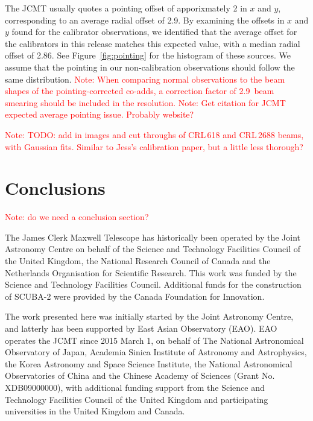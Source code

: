 \documentclass[twocolumn,times]{aastex6}
\newcommand{\note}[1]{\textcolor{red}{Note: #1}}
\begin{document}
The JCMT usually quotes a pointing offset of apporixmately 2\arcsec{}
in $x$ and $y$, corresponding to an average radial offset of
2.9\arcsec{}. By examining the offsets in $x$ and $y$ found for the
calibrator observations, we identified that the average offset for the
calibrators in this release matches this expected value, with a median
radial offset of 2.86\arcsec{}. See Figure~\ref{fig:pointing} for the
histogram of these sources. We assume that the pointing in our
non-calibration observations should follow the same distribution. \note{When
comparing normal observations to the beam shapes of the
pointing-corrected co-adds, a correction factor of 2.9\arcsec\ beam
smearing should be included in the resolution.}
\note{Get citation for JCMT expected average pointing issue. Probably
  website?}

\note{TODO: add in images and cut throughs of CRL\,618 and CRL\,2688
  beams, with Gaussian fits. Similar to Jess's calibration paper, but
  a little less thorough?}






\section{Conclusions}
\note{do we need a conclusion section?}

\acknowledgments
The James Clerk Maxwell Telescope has historically been operated by
the Joint Astronomy Centre on behalf of the Science and Technology
Facilities Council of the United Kingdom, the National Research
Council of Canada and the Netherlands Organisation for Scientific
Research. This work was funded by the Science and Technology
Facilities Council.  Additional funds for the construction of SCUBA-2
were provided by the Canada Foundation for Innovation.

The work presented here was initially started by the Joint Astronomy
Centre, and latterly has been supported by East Asian Observatory (EAO).
EAO operates the JCMT since 2015 March 1, on behalf of The
National Astronomical Observatory of Japan, Academia Sinica Institute
of Astronomy and Astrophysics, the Korea Astronomy and Space Science
Institute, the National Astronomical Observatories of China and the
Chinese Academy of Sciences (Grant No. XDB09000000), with additional
funding support from the Science and Technology Facilities Council of
the United Kingdom and participating universities in the United
Kingdom and Canada.
\end{document}
